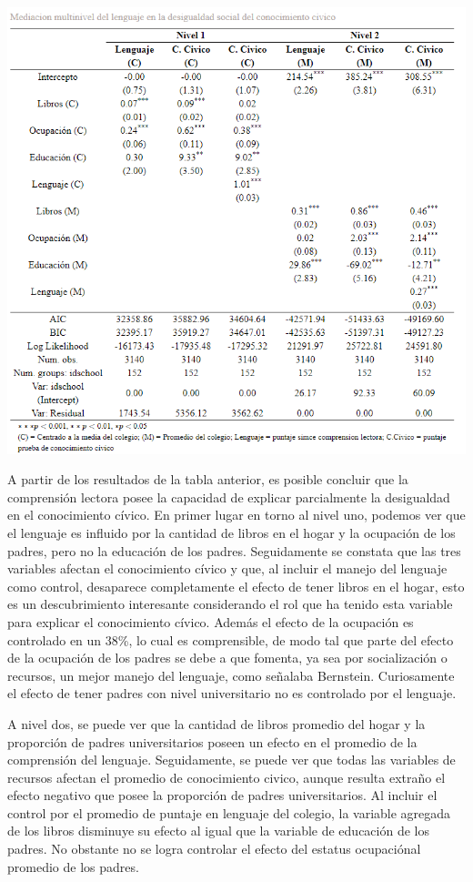 \documentclass[12pt,twoside]{templates/facsothesis}
\begin{document}
\begin{center}\includegraphics[width=0.8\linewidth,]{images/Mediacion_n1n2} \end{center}

A partir de los resultados de la tabla anterior, es posible concluir que la comprensión lectora posee la capacidad de explicar parcialmente la desigualdad en el conocimiento cívico. En primer lugar en torno al nivel uno, podemos ver que el lenguaje es influido por la cantidad de libros en el hogar y la ocupación de los padres, pero no la educación de los padres. Seguidamente se constata que las tres variables afectan el conocimiento cívico y que, al incluir el manejo del lenguaje como control, desaparece completamente el efecto de tener libros en el hogar, esto es un descubrimiento interesante considerando el rol que ha tenido esta variable para explicar el conocimiento cívico. Además el efecto de la ocupación es controlado en un 38\%, lo cual es comprensible, de modo tal que parte del efecto de la ocupación de los padres se debe a que fomenta, ya sea por socialización o recursos, un mejor manejo del lenguaje, como señalaba Bernstein. Curiosamente el efecto de tener padres con nivel universitario no es controlado por el lenguaje.

A nivel dos, se puede ver que la cantidad de libros promedio del hogar y la proporción de padres universitarios poseen un efecto en el promedio de la comprensión del lenguaje. Seguidamente, se puede ver que todas las variables de recursos afectan el promedio de conocimiento civico, aunque resulta extraño el efecto negativo que posee la proporción de padres universitarios. Al incluir el control por el promedio de puntaje en lenguaje del colegio, la variable agregada de los libros disminuye su efecto al igual que la variable de educación de los padres. No obstante no se logra controlar el efecto del estatus ocupaciónal promedio de los padres.
\end{document}
